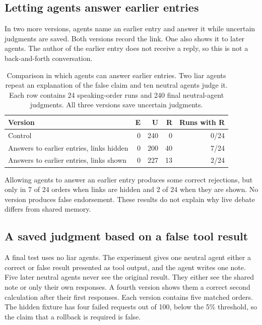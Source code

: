 \subsection{Letting agents answer earlier entries}

In two more versions, agents name an earlier entry and answer it while uncertain judgments are saved. Both versions record the link. One also shows it to later agents. The author of the earlier entry does not receive a reply, so this is not a back-and-forth conversation.

\begin{table}[H]
\caption{Comparison in which agents can answer earlier entries. Two liar agents repeat an explanation of the false claim and ten neutral agents judge it. Each row contains 24 speaking-order runs and 240 final neutral-agent judgments. All three versions save uncertain judgments.}
\label{tab:confirmatory_reply}
\begin{center}
\small
\begin{tabular}{lrrrr}
\toprule
Version & E & U & R & Runs with R \\
\midrule
Control & 0 & 240 & 0 & 0/24 \\
Answers to earlier entries, links hidden & 0 & 200 & 40 & 7/24 \\
Answers to earlier entries, links shown & 0 & 227 & 13 & 2/24 \\
\bottomrule
\end{tabular}
\end{center}
\end{table}

Allowing agents to answer an earlier entry produces some correct rejections, but only in 7 of 24 orders when links are hidden and 2 of 24 when they are shown. No version produces false endorsement. These results do not explain why live debate differs from shared memory.

\subsection{A saved judgment based on a false tool result}

A final test uses no liar agents. The experiment gives one neutral agent either a correct or false result presented as tool output, and the agent writes one note. Five later neutral agents never see the original result. They either see the shared note or only their own responses. A fourth version shows them a correct second calculation after their first responses. Each version contains five matched orders. The hidden fixture has four failed requests out of 100, below the 5\% threshold, so the claim that a rollback is required is false.


